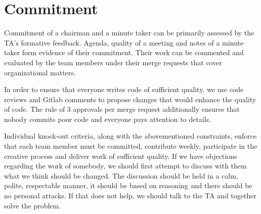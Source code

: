 \section{Commitment}

Commitment of a chairman and a minute taker can be primarily assessed by the TA's formative feedback. Agenda, quality of a meeting and notes of a minute taker form evidence of their commitment. Their work can be commented and evaluated by the team members under their merge requests that cover organizational matters.

In order to ensure that everyone writes code of sufficient quality, we use code reviews and Gitlab comments to propose changes that would enhance the quality of code. The rule of 3 approvals per merge request additionally ensures that nobody commits poor code and everyone pays attention to details.

Individual knock-out criteria, along with the abovementioned constraints, enforce that each team member must be committed, contribute weekly, participate in the creative process and deliver work of sufficient quality. If we have objections regarding the work of somebody, we should first attempt to discuss with them what we think should be changed. The discussion should be held in a calm, polite, respectable manner, it should be based on reasoning and there should be no personal attacks. If that does not help, we should talk to the TA and together solve the problem.